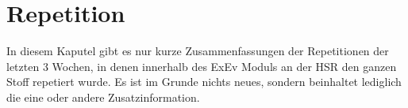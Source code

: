 \section{Repetition}
\begin{tcolorbox}[colback=gray!5,colframe=gray!40!black, title=Hinweis]
In diesem Kaputel gibt es nur kurze Zusammenfassungen der Repetitionen der letzten 3 Wochen, in denen innerhalb des ExEv Moduls an der HSR den ganzen Stoff repetiert wurde. Es ist im Grunde nichts neues, sondern beinhaltet lediglich die eine oder andere Zusatzinformation.
\end{tcolorbox}

